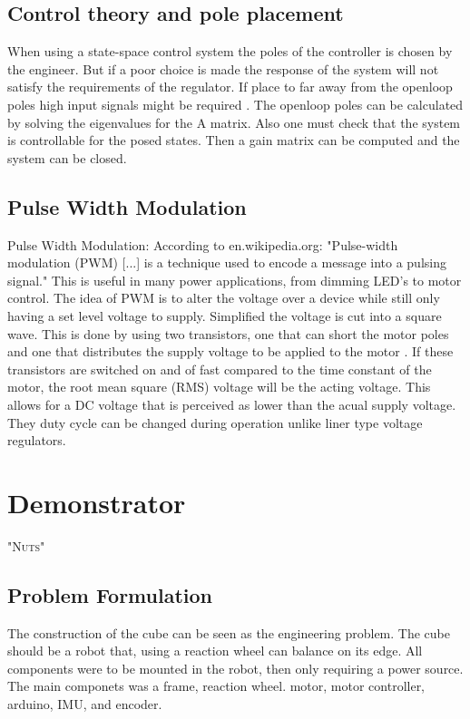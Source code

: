 \documentclass[a4paper,11pt]{kth-mag}
\begin{document}
\section{Control theory and pole placement}
When using a state-space control system the poles of the controller is chosen by the engineer. But if a poor choice
is made the response of the system will not satisfy the requirements of the regulator. If place to far away from the 
openloop poles high input signals might be required \cite{regler}. The openloop poles can be calculated by solving the eigenvalues 
for the A matrix. Also one must check that the system is controllable for the posed states. Then a gain matrix can 
be computed and the system can be closed.

\section{Pulse Width Modulation}
Pulse Width Modulation:
According to en.wikipedia.org: "Pulse-width modulation (PWM) [...] is a technique used to encode a message into a 
pulsing signal."
This is useful in many power applications, from dimming LED's to motor control. The idea of 
PWM is to alter the voltage over a device while still only having a set level voltage to supply. Simplified  
the voltage is cut into a square wave. This is done by using two transistors, one that can short the motor poles and one that distributes the supply voltage to be applied to the motor \cite{elektro}. If these transistors are switched on and of fast 
compared to the time constant of the motor, the root mean square (RMS) voltage will be the acting voltage.
This allows for a DC voltage that is perceived as lower than the acual supply voltage.
They duty cycle can be changed during operation unlike liner type voltage regulators. 
 
\chapter{Demonstrator}

\textsc{"Nuts"}

\section{Problem Formulation}
The construction of the cube can be seen as the engineering problem. The cube should be a robot that,
using a reaction wheel can balance on its edge. All components were to be mounted in the robot, then only 
requiring a power source. The main componets was a frame, reaction wheel. motor, motor controller, arduino, IMU, 
and encoder.  
\end{document}
